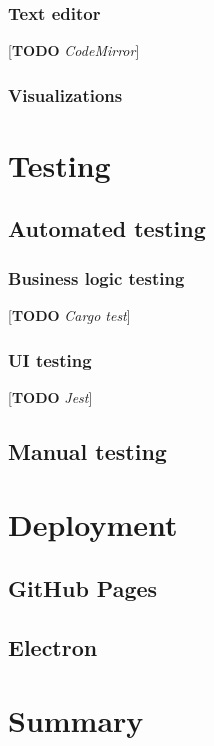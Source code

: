 \documentclass[english,engineering]{wizthesis}
\newcommand{\todo}[1]{{\color{red}[\textbf{TODO} \textit{#1}]}}
\begin{document}
\subsection{Text editor}

\todo{CodeMirror}

\subsection{Visualizations}

\chapter{Testing}

\section{Automated testing}

\subsection{Business logic testing}

\todo{Cargo test}

\subsection{UI testing}

\todo{Jest}

\section{Manual testing}

\chapter{Deployment}

\section{GitHub Pages}

\section{Electron}

{\backmatter %
\chapter{Summary}}
\end{document}
